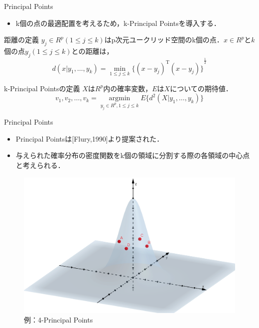 \documentclass[unicode,11pt]{beamer}
\begin{document}
\begin{frame}{Principal Points}
    \begin{itemize}
        \item k個の点の最適配置を考えるため，k-Principal Pointsを導入する．
    \end{itemize}
    \begin{block}{距離の定義}
        $y_j \in R^p (1\le j \le k)$はp次元ユークリッド空間のk個の点．$x \in  R^p$と$k$個の点$y_j (1 \le j \le k)$との距離は，
        \begin{equation*}
            d(x|y_1,\dots,y_k) = \min_{1\le j \le k}{\{(x-y_j)^{\mathrm{T}}(x-y_j)\}}^{\frac{1}{2}}
        \end{equation*}
    \end{block}
    \begin{block}{k-Principal Pointsの定義}
        $X$は$R^p$内の確率変数，$E$は$X$についての期待値．
        \begin{equation*}
            v_1,v_2,\dots,v_k = \underset{y_j \in R^p, 1\le j \le k}{\operatorname{argmin}} E\{d^2(X|y_1,\dots, y_k)\}
        \end{equation*}
    \end{block}
\end{frame}

\begin{frame}{Principal Points}
    \begin{itemize}
        \item Principal Pointsは[Flury,1990]より提案された．
        \item 与えられた確率分布の密度関数をk個の領域に分割する際の各領域の中心点と考えられる．
    \end{itemize}
    \begin{figure}
        \centering
        \includegraphics[keepaspectratio,scale = 0.2]{4-principal_points.png}
        \caption{例：4-Principal Points}
    \end{figure}
\end{frame}
\end{document}
